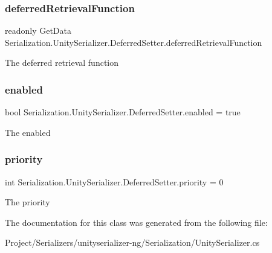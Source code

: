\subsubsection{\texorpdfstring{deferred\+Retrieval\+Function}{deferredRetrievalFunction}}
{\footnotesize\ttfamily readonly Get\+Data Serialization.\+Unity\+Serializer.\+Deferred\+Setter.\+deferred\+Retrieval\+Function}



The deferred retrieval function 

\mbox{\label{class_serialization_1_1_unity_serializer_1_1_deferred_setter_a961e4fd57df2a9953490423766553f9f}} 
\subsubsection{\texorpdfstring{enabled}{enabled}}
{\footnotesize\ttfamily bool Serialization.\+Unity\+Serializer.\+Deferred\+Setter.\+enabled = true}



The enabled 

\mbox{\label{class_serialization_1_1_unity_serializer_1_1_deferred_setter_ab5f7f3dd9252c8ec009307041c97f3c4}} 
\subsubsection{\texorpdfstring{priority}{priority}}
{\footnotesize\ttfamily int Serialization.\+Unity\+Serializer.\+Deferred\+Setter.\+priority = 0}



The priority 



The documentation for this class was generated from the following file\+:\begin{DoxyCompactItemize}
\item 
Project/\+Serializers/unityserializer-\/ng/\+Serialization/Unity\+Serializer.\+cs\end{DoxyCompactItemize}
